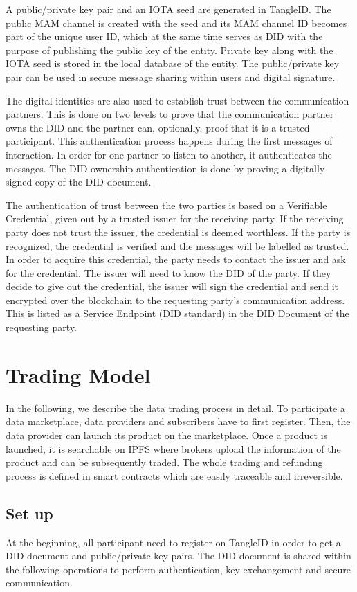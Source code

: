 \documentclass[conference]{IEEEtran}
\begin{document}
A public/private key pair and an IOTA seed are generated in TangleID. The public MAM channel is created with the seed and its MAM channel ID becomes part of the unique user ID, which at the same time serves as DID with the purpose of publishing the public key of the entity. Private key along with the IOTA seed is stored in the local database of the entity. The public/private key pair can be used in secure message sharing within users and digital signature.

The digital identities are also used to establish trust between the communication partners. This is done on two levels to prove that the communication partner owns the DID and the partner can, optionally, proof that it is a trusted participant. This authentication process happens during the first messages of interaction. In order for one partner to listen to another, it authenticates the messages. The DID ownership authentication is done by proving a digitally signed copy of the DID document.

The authentication of trust between the two parties is based on a Verifiable Credential, given out by a trusted issuer for the receiving party. If the receiving party does not trust the issuer, the credential is deemed worthless. If the party is recognized, the credential is verified and the messages will be labelled as trusted. In order to acquire this credential, the party needs to contact the issuer and ask for the credential. The issuer will need to know the DID of the party. If they decide to give out the credential, the issuer will sign the credential and send it encrypted over the blockchain to the requesting party's communication address. This is listed as a Service Endpoint (DID standard) in the DID Document of the requesting party.

\section{Trading Model}
In the following, we describe the data trading process in detail. To participate a data marketplace, data providers and subscribers have to first register. Then,  the data provider can launch its product on the marketplace. Once a product is launched, it is searchable on IPFS where brokers upload the information of the product and can be subsequently traded. The whole trading and refunding process is defined in smart contracts which are easily traceable and irreversible.

\subsection{Set up}
At the beginning, all participant need to register on TangleID in order to get a DID document and public/private key pairs. The DID document is shared within the following operations to perform authentication, key exchangement and secure communication. 
\end{document}
